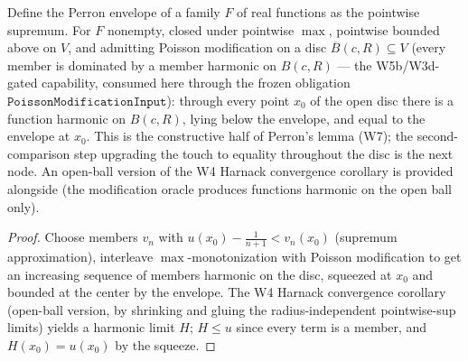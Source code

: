 \begin{lemma}
\label{lem:perron-envelope-center-touch}
Define the Perron envelope of a family \(F\) of real functions as the
pointwise supremum.  For \(F\) nonempty, closed under pointwise
\(\max\), pointwise bounded above on \(V\), and admitting Poisson
modification on a disc \(\overline{B}(c, R) \subseteq V\) (every member
is dominated by a member harmonic on \(B(c, R)\) — the W5b/W3d-gated
capability, consumed here through the frozen obligation
\(\texttt{PoissonModificationInput}\)): through every point \(x_0\) of
the open disc there is a function harmonic on \(B(c, R)\), lying below
the envelope, and equal to the envelope at \(x_0\).  This is the
constructive half of Perron's lemma (W7); the second-comparison step
upgrading the touch to equality throughout the disc is the next node.
An open-ball version of the W4 Harnack convergence corollary is
provided alongside (the modification oracle produces functions harmonic
on the open ball only).
\leanok
\end{lemma}
\begin{proof}\leanok
Choose members \(v_n\) with
\(u(x_0) - \tfrac{1}{n+1} < v_n(x_0)\) (supremum approximation),
interleave \(\max\)-monotonization with Poisson modification to get an
increasing sequence of members harmonic on the disc, squeezed at
\(x_0\) and bounded at the center by the envelope.  The W4 Harnack
convergence corollary (open-ball version, by shrinking and gluing the
radius-independent pointwise-sup limits) yields a harmonic limit \(H\);
\(H \le u\) since every term is a member, and \(H(x_0) = u(x_0)\) by
the squeeze.
\end{proof}


